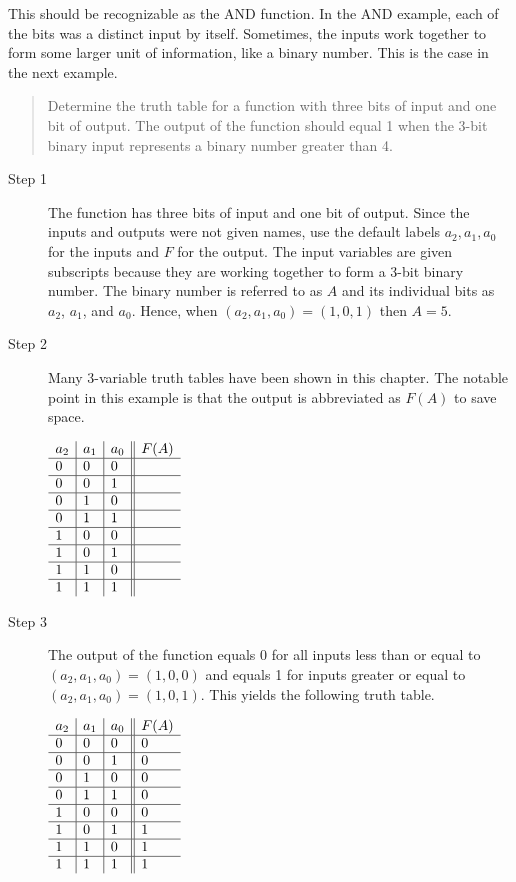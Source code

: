 This should be recognizable as the AND function.  In the
AND example, each of the bits was a distinct input by itself.  
Sometimes, the inputs work together to form some larger unit of
information, like a binary number.  This is the case in the next
example.

\begin{quote}
Determine the truth table for a function with three bits of input and
one bit of output.  The output of the function should equal 1 when
the 3-bit binary input represents a binary number greater than 4.
\end{quote}

\begin{description}
\item [Step 1] The function has three bits of input and one bit of output.  
Since the inputs and outputs were not given names, use the default labels
$a_2,a_1,a_0$ for the inputs and $F$ for the output.  The input
variables are given subscripts because they are working together to 
form a 3-bit binary number.  The binary number is referred to as
$A$ and its individual bits as $a_2$, $a_1$, and $a_0$.  Hence,
when $(a_2,a_1,a_0) = (1,0,1)$ then $A=5$.

\item [Step 2] Many 3-variable truth tables have been shown in this
chapter.  The notable point in this example is that the output is 
abbreviated as $F(A)$ to save space.

$\begin{array}[ht]{l|l|l||l}
a_2 & a_1 & a_0 & F(A)		\\ \hline
0   & 0   & 0   &		\\ \hline
0   & 0   & 1   &		\\ \hline
0   & 1   & 0   &		\\ \hline
0   & 1   & 1   &		\\ \hline
1   & 0   & 0   &		\\ \hline
1   & 0   & 1   &		\\ \hline
1   & 1   & 0   &		\\ \hline
1   & 1   & 1   &		\\ 
\end{array}$

\item [Step 3] The output of the function equals 0 for all inputs
less than or equal to $(a_2,a_1,a_0) = (1,0,0)$ and equals 1 for 
inputs greater or equal to $(a_2,a_1,a_0) = (1,0,1)$.  This yields
the following truth table.

$\begin{array}[ht]{l|l|l||l}
a_2 & a_1 & a_0 & F(A)		\\ \hline
0   & 0   & 0   &	0	\\ \hline
0   & 0   & 1   &	0	\\ \hline
0   & 1   & 0   &	0	\\ \hline
0   & 1   & 1   &	0	\\ \hline
1   & 0   & 0   &	0	\\ \hline
1   & 0   & 1   &	1	\\ \hline
1   & 1   & 0   &	1	\\ \hline
1   & 1   & 1   &	1	\\ 
\end{array}$


\end{description}
